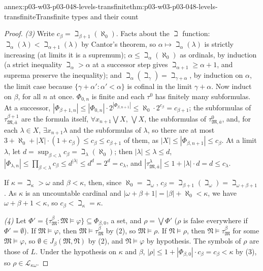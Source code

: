 \begin{annexitem}{annex:p03-w03-p03-048-levels-transfinite}{thm:p03-w03-p03-048-levels-transfinite}{Transfinite types and their count}
\begin{proof}
\emph{(3)}  Write \(c_\beta=\beth_{\beta+1}(\aleph_0)\).  Facts about the
\(\beth\) function: \(\beth_\alpha(\lambda)<\beth_{\alpha+1}(\lambda)\) by
Cantor's theorem, so \(\alpha\mapsto\beth_\alpha(\lambda)\) is strictly
increasing (at limits it is a supremum); \(\alpha\leq\beth_\alpha(\aleph_0)\)
as ordinals, by induction (a strict inequality \(\beth_\alpha>\alpha\) at a
successor step gives \(\beth_{\alpha+1}\geq\alpha+1\), and suprema preserve
the inequality); and \(\beth_\alpha(\beth_\gamma)=\beth_{\gamma+\alpha}\), by
induction on \(\alpha\), the limit case because \(\{\gamma+\alpha':\alpha'<
\alpha\}\) is cofinal in the limit \(\gamma+\alpha\).  Now induct on
\(\beta\), for all \(n\) at once.  \(\Phi_{0,n}\) is finite and each
\(\tau^0\) has finitely many subformulas.  At a successor,
\(|\Phi_{\beta+1,n}|\leq|\Phi_{0,n}|\cdot2^{|\Phi_{\beta,n+1}|}\leq\aleph_0
\cdot2^{c_\beta}=c_{\beta+1}\); the subformulas of
\(\tau^{\beta+1}_{\mathfrak M,\bar a}\) are the formula itself,
\(\forall x_{n+1}\bigvee X\), \(\bigvee X\), the subformulas of
\(\tau^0_{\mathfrak M,\bar a}\), and, for each \(\lambda\in X\),
\(\exists x_{n+1}\lambda\) and the subformulas of \(\lambda\), so there are at
most \(3+\aleph_0+|X|\cdot(1+c_\beta)\leq c_\beta\leq c_{\beta+1}\) of them,
as \(|X|\leq|\Phi_{\beta,n+1}|\leq c_\beta\).  At a limit \(\lambda\), let
\(d=\sup_{\beta<\lambda}c_\beta=\beth_\lambda(\aleph_0)\); then
\(|\lambda|\leq\lambda\leq d\), \(|\Phi_{\lambda,n}|\leq\prod_{\beta<\lambda}
c_\beta\leq d^{|\lambda|}\leq d^{d}=2^{d}=c_\lambda\), and
\(|\tau^{\lambda}_{\mathfrak M,\bar a}|\leq1+|\lambda|\cdot d=d\leq
c_\lambda\).

If \(\kappa=\beth_\kappa>\omega\) and \(\beta<\kappa\), then, since
\(\aleph_0=\beth_\omega\), \(c_\beta=\beth_{\beta+1}(\beth_\omega)=
\beth_{\omega+\beta+1}\).  As \(\kappa\) is an uncountable cardinal and
\(|\omega+\beta+1|=|\beta|+\aleph_0<\kappa\), we have
\(\omega+\beta+1<\kappa\), so \(c_\beta<\beth_\kappa=\kappa\).

\emph{(4)}  Let \(\Phi'=\{\tau^{\beta}_{\mathfrak M}:\mathfrak M\models
\varphi\}\subseteq\Phi_{\beta,0}\), a set, and \(\rho=\bigvee\Phi'\)
(\(\rho\) is false everywhere if \(\Phi'=\emptyset\)).  If
\(\mathfrak M\models\varphi\), then \(\mathfrak M\models\tau^{\beta}_{\mathfrak
M}\) by (2), so \(\mathfrak M\models\rho\).  If \(\mathfrak N\models\rho\),
then \(\mathfrak N\models\tau^{\beta}_{\mathfrak M}\) for some \(\mathfrak M
\models\varphi\), so \(\emptyset\in J_\beta(\mathfrak M,\mathfrak N)\) by
(2), and \(\mathfrak N\models\varphi\) by hypothesis.  The symbols of
\(\rho\) are those of \(L\).  Under the hypothesis on \(\kappa\) and
\(\beta\), \(|\rho|\leq1+|\Phi_{\beta,0}|\cdot c_\beta=c_\beta<\kappa\) by
(3), so \(\rho\in\mathcal L_{\kappa\omega}\).
\end{proof}
\end{annexitem}

